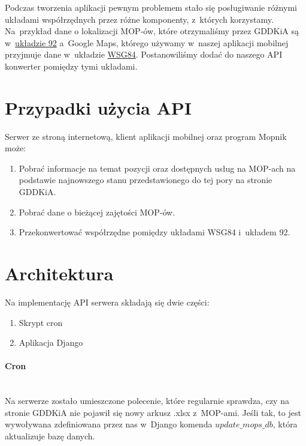 Podczas tworzenia aplikacji pewnym problemem stało się posługiwanie różnymi układami współrzędnych przez różne komponenty, z~których korzystamy. Na~przykład dane o lokalizacji MOP-ów, które otrzymaliśmy przez GDDKiA są w~\href{https://pl.wikipedia.org/wiki/Uk\%C5\%82ad_wsp\%C3\%B3\%C5\%82rz\%C4\%99dnych_1992}{układzie 92}\cite{uklad-92} a~Google Maps, którego używamy w~naszej aplikacji mobilnej przyjmuje dane w~układzie \href{https://pl.wikipedia.org/wiki/System_odniesienia_WGS_84}{WSG84}. Postanowiliśmy dodać do naszego API konwerter pomiędzy tymi układami.
\section{Przypadki użycia API}
Serwer ze stroną internetową, klient aplikacji mobilnej oraz program Mopnik może:
\begin{enumerate}
\item Pobrać informacje na temat pozycji oraz dostępnych usług na MOP-ach na podstawie najnowszego stanu przedstawionego do tej pory na stronie GDDKiA.
\item Pobrać dane o bieżącej zajętości MOP-ów.
\item Przekonwertować współrzędne pomiędzy układami WSG84 i~układem 92.
\end{enumerate}
\section{Architektura}
Na implementację API serwera składają się dwie części:
\begin{enumerate}
\item Skrypt cron
\item Aplikacja Django
\end{enumerate}
\paragraph{Cron}\mbox{}\\
Na serwerze zostało umieszczone polecenie, które regularnie sprawdza, czy na stronie GDDKiA nie pojawił się nowy arkusz .xlsx z~MOP-ami. Jeśli tak, to jest wywoływana zdefiniowana przez nas w~Django komenda $\textit{update\_mops\_db}$, która aktualizuje bazę danych.
